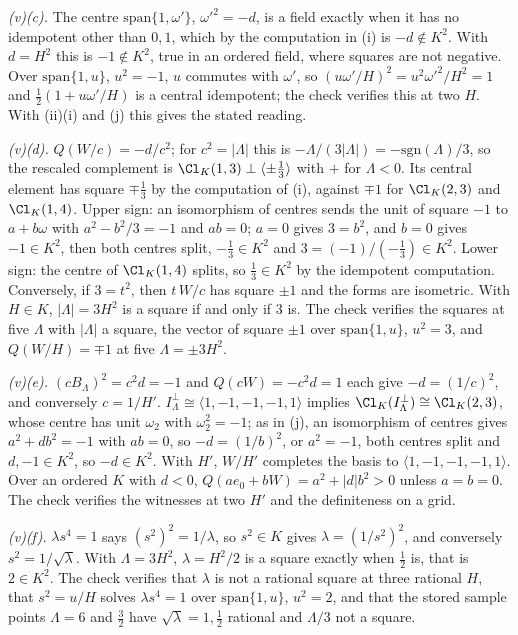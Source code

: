 \emph{(v)(c).} The centre $\mathrm{span}\{1, \omega'\}$, $\omega'^{2} = -d$, is a field exactly when it has no idempotent other than $0, 1$, which by the computation in (i) is $-d \notin K^{2}$. With $d = H^{2}$ this is $-1 \notin K^{2}$, true in an ordered field, where squares are not negative. Over $\mathrm{span}\{1, u\}$, $u^{2} = -1$, $u$ commutes with $\omega'$, so $(u\omega'/H)^{2} = u^{2}\omega'^{2}/H^{2} = 1$ and $\tfrac12(1 + u\omega'/H)$ is a central idempotent; the check verifies this at two $H$. With (ii)(i) and (j) this gives the stated reading.

\emph{(v)(d).} $Q(W/c) = -d/c^{2}$; for $c^{2} = |\Lambda|$ this is $-\Lambda/(3|\Lambda|) = -\mathrm{sgn}(\Lambda)/3$, so the rescaled complement is $\Cl_{K}(1,3) \perp \langle \pm\tfrac13\rangle$ with $+$ for $\Lambda < 0$. Its central element has square $\mp\tfrac13$ by the computation of (i), against $\mp 1$ for $\Cl_{K}(2,3)$ and $\Cl_{K}(1,4)$. Upper sign: an isomorphism of centres sends the unit of square $-1$ to $a + b\omega$ with $a^{2} - b^{2}/3 = -1$ and $ab = 0$; $a = 0$ gives $3 = b^{2}$, and $b = 0$ gives $-1 \in K^{2}$, then both centres split, $-\tfrac13 \in K^{2}$ and $3 = (-1)/(-\tfrac13) \in K^{2}$. Lower sign: the centre of $\Cl_{K}(1,4)$ splits, so $\tfrac13 \in K^{2}$ by the idempotent computation. Conversely, if $3 = t^{2}$, then $t\,W/c$ has square $\pm 1$ and the forms are isometric. With $H \in K$, $|\Lambda| = 3H^{2}$ is a square if and only if $3$ is. The check verifies the squares at five $\Lambda$ with $|\Lambda|$ a square, the vector of square $\pm1$ over $\mathrm{span}\{1, u\}$, $u^{2} = 3$, and $Q(W/H) = \mp 1$ at five $\Lambda = \pm 3H^{2}$.

\emph{(v)(e).} $(cB_{\Lambda})^{2} = c^{2}d = -1$ and $Q(cW) = -c^{2}d = 1$ each give $-d = (1/c)^{2}$, and conversely $c = 1/H'$. $I_{\Lambda}^{\perp} \cong \langle 1, -1, -1, -1, 1\rangle$ implies $\Cl_{K}(I_{\Lambda}^{\perp}) \cong \Cl_{K}(2,3)$, whose centre has unit $\omega_{2}$ with $\omega_{2}^{2} = -1$; as in (j), an isomorphism of centres gives $a^{2} + db^{2} = -1$ with $ab = 0$, so $-d = (1/b)^{2}$, or $a^{2} = -1$, both centres split and $d, -1 \in K^{2}$, so $-d \in K^{2}$. With $H'$, $W/H'$ completes the basis to $\langle 1, -1, -1, -1, 1\rangle$. Over an ordered $K$ with $d < 0$, $Q(ae_{0} + bW) = a^{2} + |d|b^{2} > 0$ unless $a = b = 0$. The check verifies the witnesses at two $H'$ and the definiteness on a grid.

\emph{(v)(f).} $\lambda s^{4} = 1$ says $(s^{2})^{2} = 1/\lambda$, so $s^{2} \in K$ gives $\lambda = (1/s^{2})^{2}$, and conversely $s^{2} = 1/\sqrt{\lambda}$. With $\Lambda = 3H^{2}$, $\lambda = H^{2}/2$ is a square exactly when $\tfrac12$ is, that is $2 \in K^{2}$. The check verifies that $\lambda$ is not a rational square at three rational $H$, that $s^{2} = u/H$ solves $\lambda s^{4} = 1$ over $\mathrm{span}\{1, u\}$, $u^{2} = 2$, and that the stored sample points $\Lambda = 6$ and $\tfrac32$ have $\sqrt{\lambda} = 1, \tfrac12$ rational and $\Lambda/3$ not a square.
